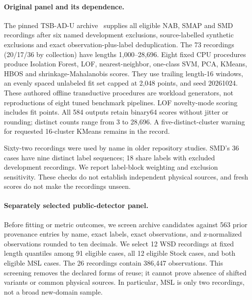 \paragraph{Original panel and its dependence.}
The pinned TSB-AD-U archive~\cite{tsbad} supplies all eligible NAB, SMAP and SMD
recordings after six named development exclusions, source-labelled synthetic
exclusions and exact observation-plus-label deduplication. The 73 recordings
(20/17/36 by collection) have lengths 1,000--28,696. Eight fixed CPU procedures
produce Isolation Forest, LOF, nearest-neighbor, one-class SVM, PCA, KMeans,
HBOS and shrinkage-Mahalanobis scores. They use trailing length-16 windows,
an evenly spaced unlabeled fit set capped at 2,048 points, and seed 20261024.
These authored offline transductive procedures are workload generators, not
reproductions of eight tuned benchmark pipelines. LOF novelty-mode scoring
includes fit points. All 584 outputs retain binary64 scores without jitter or
rounding; distinct counts range from 3 to 28,696. A five-distinct-cluster warning
for requested 16-cluster KMeans remains in the record.

Sixty-two recordings were used by name in older repository studies. SMD's
36 cases have nine distinct label sequences; 18 share labels with excluded
development recordings. We report label-block weighting and exclusion
sensitivity. These checks do not establish independent physical sources, and
fresh scores do not make the recordings unseen.

\paragraph{Separately selected public-detector panel.}
Before fitting or metric outcomes, we screen archive candidates against 563
prior provenance entries by name, exact labels, exact observations, and
z-normalized observations rounded to ten decimals. We select 12 WSD recordings
at fixed length quantiles among 91 eligible cases, all 12 eligible Stock cases,
and both eligible MSL cases. The 26 recordings contain 386,447 observations.
This screening removes the declared forms of reuse; it cannot prove absence
of shifted variants or common physical sources. In particular, MSL is only two
recordings, not a broad new-domain sample.

